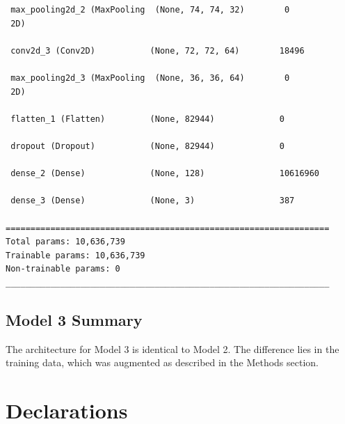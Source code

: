 \documentclass[pdflatex,sn-mathphys-num]{sn-jnl}%
\theoremstyle{thmstyleone}%
\theoremstyle{thmstyletwo}%
\theoremstyle{thmstylethree}%
\begin{document}
\begin{appendices}
\begin{verbatim}
 max_pooling2d_2 (MaxPooling  (None, 74, 74, 32)        0         
 2D)                                                             
                                                                 
 conv2d_3 (Conv2D)           (None, 72, 72, 64)        18496     
                                                                 
 max_pooling2d_3 (MaxPooling  (None, 36, 36, 64)        0         
 2D)                                                             
                                                                 
 flatten_1 (Flatten)         (None, 82944)             0         
                                                                 
 dropout (Dropout)           (None, 82944)             0         
                                                                 
 dense_2 (Dense)             (None, 128)               10616960  
                                                                 
 dense_3 (Dense)             (None, 3)                 387       
                                                                 
=================================================================
Total params: 10,636,739
Trainable params: 10,636,739
Non-trainable params: 0
_________________________________________________________________
\end{verbatim}

\subsection{Model 3 Summary}
The architecture for Model 3 is identical to Model 2. The difference lies in the training data, which was augmented as described in the Methods section.

\end{appendices}


\section*{Declarations}
\end{document}
